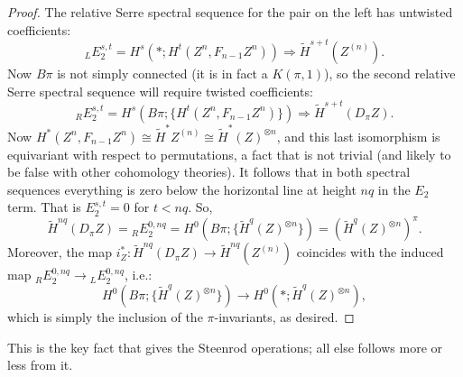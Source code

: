 \documentclass{article}
\renewcommand{\to}{\longrightarrow}
\theoremstyle{definition}
\begin{document}
\begin{proof}
The relative Serre spectral sequence for the pair on the left has untwisted coefficients:
\[
_LE_2^{s,t} = H^s(*; H^t(Z^n, F_{n-1} Z^n)) \Rightarrow \widetilde H^{s+t}(Z^{(n)})
.\]
Now $B \pi$ is not simply connected (it is in fact a $K(\pi,1)$), so the second relative Serre spectral sequence will require twisted coefficients:
\[
_RE_2^{s,t} = H^s(B\pi; \{H^t(Z^n, F_{n-1} Z^n)\}) \Rightarrow \widetilde H^{s+t}(D_\pi Z)
.\]
Now $H^*(Z^n, F_{n-1} Z^n) \cong \widetilde H^* Z^{(n)} \cong \widetilde H^*(Z)^{\otimes n}$, and this last isomorphism is equivariant with respect to permutations, a fact that is not trivial (and likely to be false with other cohomology theories).  It follows that in both spectral sequences everything is zero below the horizontal line at height $nq$ in the $E_2$ term. That is $E_2^{s,t}=0$ for $t<nq$.  So, %
\[
\widetilde H^{nq}(D_\pi Z) ={_RE_2^{0,nq}}= H^0(B\pi; \{\widetilde H^q(Z)^{\otimes n}\}) = (\widetilde H^q(Z)^{\otimes n})^\pi.\]
Moreover, the map $i^*_Z:\widetilde H^{nq}(D_\pi Z)\to \widetilde H^{nq}(Z^{(n)})$ coincides with the induced map $_RE_2^{0,nq}\to{_LE_2^{0,nq}}$, i.e.: %
\[H^0(B\pi; \{\widetilde H^q(Z)^{\otimes n}\})\to H^0(*;\widetilde H^q(Z)^{\otimes n}),\]
which is simply the inclusion of the $\pi$-invariants, as desired.
\end{proof}
\noindent This is the key fact that gives the Steenrod operations; all else follows more or less from it.
\end{document}
